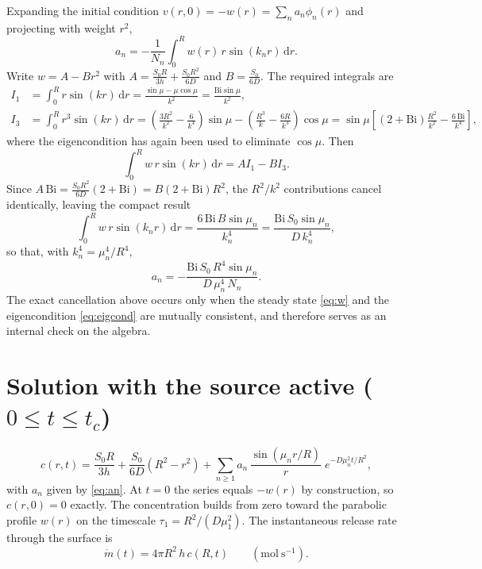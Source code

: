 \documentclass[11pt,a4paper]{article}
\newcommand{\Bi}{\mathrm{Bi}}
\newcommand{\dd}{\,\mathrm{d}}
\begin{document}
Expanding the initial condition $v(r,0) = -w(r) = \sum_n a_n \phi_n(r)$ and projecting
with weight $r^2$,
\begin{equation}
a_n = -\frac{1}{N_n}\int_0^R w(r)\, r \sin(k_n r)\dd r .
\end{equation}
Write $w = A - Br^2$ with $A = \frac{S_0R}{3h} + \frac{S_0R^2}{6D}$ and
$B = \frac{S_0}{6D}$. The required integrals are
\begin{align}
I_1 &= \int_0^R r\sin(k r)\dd r = \frac{\sin\mu - \mu\cos\mu}{k^2}
     = \frac{\Bi\sin\mu}{k^2}, \\
I_3 &= \int_0^R r^3\sin(k r)\dd r
     = \left(\frac{3R^2}{k^2} - \frac{6}{k^4}\right)\sin\mu
       - \left(\frac{R^3}{k} - \frac{6R}{k^3}\right)\cos\mu
     = \sin\mu\left[(2+\Bi)\frac{R^2}{k^2} - \frac{6\,\Bi}{k^4}\right],
\end{align}
where the eigencondition has again been used to eliminate $\cos\mu$. Then
\begin{equation}
\int_0^R w\, r\sin(kr)\dd r = A I_1 - B I_3 .
\end{equation}
Since $A\,\Bi = \frac{S_0R^2}{6D}(2+\Bi) = B(2+\Bi)R^2$, the $R^2/k^2$ contributions
cancel identically, leaving the compact result
\begin{equation}
\int_0^R w\, r\sin(k_n r)\dd r = \frac{6\,\Bi\, B\sin\mu_n}{k_n^4}
= \frac{\Bi\, S_0 \sin\mu_n}{D\,k_n^4},
\end{equation}
so that, with $k_n^4 = \mu_n^4/R^4$,
\begin{equation}
\boxed{\;a_n = -\frac{\Bi\, S_0\, R^4 \sin\mu_n}{D\,\mu_n^4\, N_n}.\;}
\label{eq:an}
\end{equation}
The exact cancellation above occurs only when the steady state \eqref{eq:w} and the
eigencondition \eqref{eq:eigcond} are mutually consistent, and therefore serves as an
internal check on the algebra.

\section{Solution with the source active ($0 \le t \le t_c$)}

\begin{equation}
\boxed{\;
c(r,t) = \frac{S_0 R}{3h} + \frac{S_0}{6D}\left(R^2 - r^2\right)
+ \sum_{n\ge 1} a_n\,\frac{\sin(\mu_n r/R)}{r}\;
e^{-D\mu_n^2 t/R^2},
\;}
\label{eq:phase1}
\end{equation}
with $a_n$ given by \eqref{eq:an}. At $t=0$ the series equals $-w(r)$ by construction,
so $c(r,0)=0$ exactly. The concentration builds from zero toward the parabolic profile
$w(r)$ on the timescale $\tau_1 = R^2/(D\mu_1^2)$. The instantaneous release rate
through the surface is
\begin{equation}
\dot m(t) = 4\pi R^2\, h\, c(R,t)
\qquad \left(\mathrm{mol\ s^{-1}}\right).
\end{equation}
\end{document}
